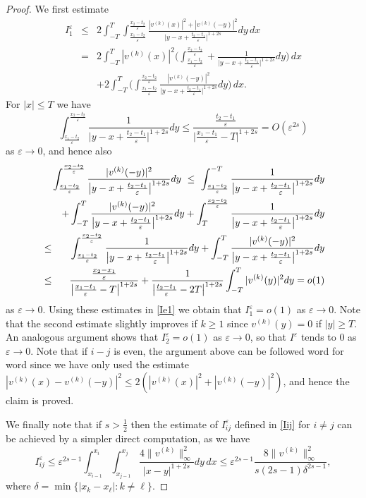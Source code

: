 \documentclass[10pt,a4paper]{amsart}
\newcommand{\e}{\varepsilon}
\begin{document}
\begin{proof}
We first estimate
\begin{eqnarray}\label{Ie1}\nonumber
I^\e_1&\le& 2\int_{-T}^{T}\int_{\frac{x_1-t_2}\e}^{\frac{x_2-t_2}\e} \frac{|v^{(k)}(x)|^2+
|v^{(k)}(-y)|^2}{\big|y-x+\frac{t_2-t_1}\e \big|^{1+2s}}dy\,dx
\\ \nonumber
&= &2\int_{-T}^{T}|v^{(k)}(x)|^2\Big(\int_{\frac{x_1-t_2}\e}^{\frac{x_2-t_2}\e} +
\frac1{\big|y-x+\frac{t_2-t_1}\e \big|^{1+2s}}dy\Big)\,dx
\\
&&+2\int_{-T}^{T}\Big(\int_{\frac{x_1-t_2}\e}^{\frac{x_2-t_2}\e} \frac{
|v^{(k)}(-y)|^2}{\big|y-x+\frac{t_2-t_1}\e \big|^{1+2s}}dy\Big)\,dx.
\end{eqnarray}
For $|x|\le T$ we have
$$
\int_{\frac{x_1-t_2}\e}^{\frac{x_2-t_2}\e} \frac{
1}{\big|y-x+\frac{t_2-t_1}\e \big|^{1+2s}}dy
\le\frac{\frac{t_2-t_1}\e}{\big|\frac{x_1-t_1}\e-T \big|^{1+2s}} =O(\e^{2s})
$$
as $\e\to 0$, and hence also
\begin{eqnarray*}
&&\hskip-1.5cm\int_{\frac{x_1-t_2}\e}^{\frac{x_2-t_2}\e} \frac{
|v^{(k)}(-y)|^2}{\big|y-x+\frac{t_2-t_1}\e \big|^{1+2s}}dy\ 
\le\ \int_{\frac{x_1-t_2}\e}^{-T} \frac{
1}{\big|y-x+\frac{t_2-t_1}\e \big|^{1+2s}}dy
\\
&&+\int_{-T}^{T} \frac{
|v^{(k)}(-y)|^2}{\big|y-x+\frac{t_2-t_1}\e \big|^{1+2s}}dy
+
\int_{T}^{\frac{x_2-t_2}\e} \frac{1}{\big|y-x+\frac{t_2-t_1}\e \big|^{1+2s}}dy
\\
&\le&
\int_{\frac{x_1-t_2}\e}^{\frac{x_2-t_2}\e} \frac{
1}{\big|y-x+\frac{t_2-t_1}\e \big|^{1+2s}}dy
+\int_{-T}^{T} \frac{
|v^{(k)}(-y)|^2}{\big|y-x+\frac{t_2-t_1}\e \big|^{1+2s}}dy
\\
&\le& \frac{\frac{x_2-x_1}\e}{\big|\frac{x_1-t_1}\e-T \big|^{1+2s}}+\frac1{\big|\frac{t_2-t_1}\e-2T \big|^{1+2s}}\int_{-T}^{T} 
|v^{(k)}(y)|^2dy=o(1)
\end{eqnarray*}
as $\e\to 0$. Using these estimates in \eqref{Ie1} we obtain that $I^\e_1=o(1)$ as $\e\to 0$. Note that the second estimate slightly improves if $k\ge 1$ since $v^{(k)}(y)=0$ if $|y|\ge T$. An analogous argument shows that $I^\e_2=o(1)$ as $\e\to 0$,
so that $I^\e$ tends to $0$ as $\e\to 0$. Note that if $i-j$ is even, the argument above can be followed word for word since we have only used the estimate $|v^{(k)}(x)-v^{(k)}(-y)|^2\le 2(|v^{(k)}(x)|^2+|v^{(k)}(-y)|^2)$, and hence the claim is proved.

We finally note that if $s>\frac12$ then the estimate of $I^\e_{ij}$ defined in \eqref{Iij}  for $i\neq j$ can be achieved by a simpler direct computation, as we have
$$
I^\e_{ij}\le\e^{2s-1} \int_{x_{i-1}}^{x_i}\int_{x_{j-1}}^{x_j}\frac{4\|v^{(k)}\|_\infty^2}{|x-y|^{1+2s}}dy\,dx\le \e^{2s-1}\frac{8\|v^{(k)}\|_\infty^2}{s(2s-1){\delta^{2s-1}}},
$$
where $\delta=\min\{|x_k-x_\ell|: k\neq \ell\}$.
\end{proof} 
\end{document}
